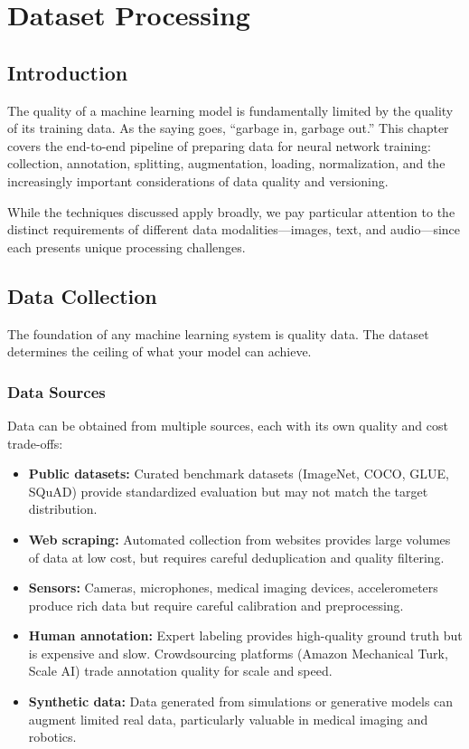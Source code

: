 ﻿\clearpage
\cleardoublepage

\chapter{Dataset Processing}

\section{Introduction}

The quality of a machine learning model is fundamentally limited by the quality of its training data. As the saying goes, ``garbage in, garbage out.'' This chapter covers the end-to-end pipeline of preparing data for neural network training: collection, annotation, splitting, augmentation, loading, normalization, and the increasingly important considerations of data quality and versioning.

While the techniques discussed apply broadly, we pay particular attention to the distinct requirements of different data modalities---images, text, and audio---since each presents unique processing challenges.

\section{Data Collection}

The foundation of any machine learning system is quality data. The dataset determines the ceiling of what your model can achieve.

\subsection{Data Sources}

Data can be obtained from multiple sources, each with its own quality and cost trade-offs:

\begin{itemize}
    \item \textbf{Public datasets:} Curated benchmark datasets (ImageNet, COCO, GLUE, SQuAD) provide standardized evaluation but may not match the target distribution.
    \item \textbf{Web scraping:} Automated collection from websites provides large volumes of data at low cost, but requires careful deduplication and quality filtering.
    \item \textbf{Sensors:} Cameras, microphones, medical imaging devices, accelerometers produce rich data but require careful calibration and preprocessing.
    \item \textbf{Human annotation:} Expert labeling provides high-quality ground truth but is expensive and slow. Crowdsourcing platforms (Amazon Mechanical Turk, Scale AI) trade annotation quality for scale and speed.
    \item \textbf{Synthetic data:} Data generated from simulations or generative models can augment limited real data, particularly valuable in medical imaging and robotics.
\end{itemize}

